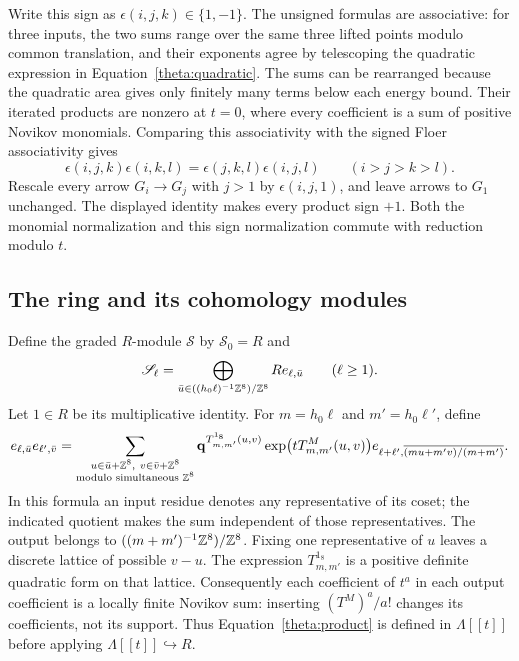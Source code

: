 Write this sign as $\epsilon(i,j,k)\in\{1,-1\}$.  The unsigned formulas
are associative: for three inputs, the two sums range over the same
three lifted points modulo common translation, and their exponents agree
by telescoping the quadratic expression in
Equation~\eqref{theta:quadratic}.  The sums can be rearranged because the
quadratic area gives only finitely many terms below each energy bound.
Their iterated products are nonzero at $t=0$, where every coefficient is
a sum of positive Novikov monomials.  Comparing this associativity with
the signed Floer associativity gives
\[
 \epsilon(i,j,k)\epsilon(i,k,l)
   =\epsilon(j,k,l)\epsilon(i,j,l)\qquad(i>j>k>l).
\]
Rescale every arrow $G_i\to G_j$ with $j>1$ by
$\epsilon(i,j,1)$, and leave arrows to $G_1$ unchanged.  The displayed
identity makes every product sign $+1$.  Both the monomial normalization
and this sign normalization commute with reduction modulo $t$.

\subsection{The ring and its cohomology modules}

Define the graded $R$-module $\mathscr S$ by $\mathscr S_0=R$ and
\[
 \mathscr S_\ell=
 \bigoplus_{\bar u\in ((h_0\ell)^{-1}\mathbb Z^8)/\mathbb Z^8}
       R e_{\ell,\bar u}\qquad(\ell\geq1).
\]
Let $1\in R$ be its multiplicative identity.  For
$m=h_0\ell$ and $m'=h_0\ell'$, define
\begin{equation}\label{theta:product}
 e_{\ell,\bar u}e_{\ell',\bar v}
 =\sum_{\substack{u\in\bar u+\mathbb Z^8,\ v\in\bar v+\mathbb Z^8\\
                         \text{modulo simultaneous }\mathbb Z^8}}
  \mathbf q^{T^{1_8}_{m,m'}(u,v)}
  \exp\bigl(tT^M_{m,m'}(u,v)\bigr)
  e_{\ell+\ell',\overline{(mu+m'v)/(m+m')}}.
\end{equation}
In this formula an input residue denotes any representative of its coset;
the indicated quotient makes the sum independent of those representatives.
The output belongs to $((m+m')^{-1}\mathbb Z^8)/\mathbb Z^8$.
Fixing one representative of $u$ leaves a discrete lattice of possible
$v-u$.  The expression $T^{1_8}_{m,m'}$ is a positive definite quadratic
form on that lattice.  Consequently each coefficient of $t^a$ in each
output coefficient is a locally finite Novikov sum: inserting
$(T^M)^a/a!$ changes its coefficients, not its support.  Thus
Equation~\eqref{theta:product} is defined in $\Lambda[[t]]$ before applying
$\Lambda[[t]]\hookrightarrow R$.

